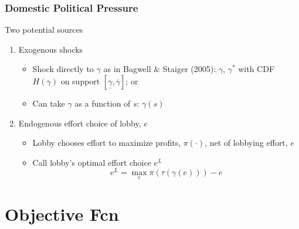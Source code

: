 \documentclass{beamer}
\newcommand{\ga}{\gamma}
\newcommand{\ov}{\overline}
\newcommand{\un}{\underline}
\begin{document}
\begin{frame}
\frametitle{Domestic Political Pressure}
Two potential sources
\pause
\begin{enumerate}[<+->]
	\item Exogenous shocks
		\begin{itemize}[<+->]
			\item Shock directly to $\ga$ as in Bagwell $\&$ Staiger (2005): $\ga$, $\ga^*$ with CDF $H(\ga)$ on support $\left[\un{\ga},\ov{\ga}\right]$; or
			\item Can take $\ga$ as a function of $s$: $\ga(s)$
		\end{itemize}
	
	\item Endogenous effort choice of lobby, $e$
		\begin{itemize}[<+->]
			\item Lobby chooses effort to maximize profits, $\pi(\cdot)$, net of lobbying effort, $e$
			\item Call lobby's optimal effort choice $e^L$
						\[
						  e^L = \max_e \pi(\tau(\ga(e))) - e
						\]
		\end{itemize}
\end{enumerate}

\end{frame}




\section{Objective Fcn}
\end{document}
